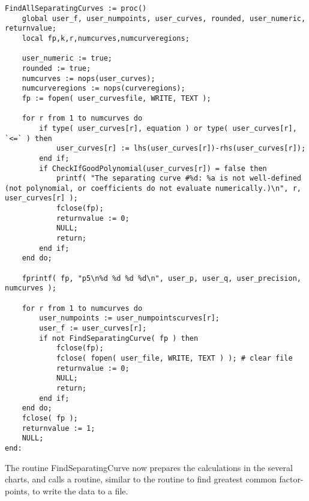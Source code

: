 \documentclass[a4paper,10pt]{article}
\begin{document}
\begin{lstlisting}[name=separatingcurves]
FindAllSeparatingCurves := proc()
    global user_f, user_numpoints, user_curves, rounded, user_numeric, returnvalue;
    local fp,k,r,numcurves,numcurveregions;

    user_numeric := true;
    rounded := true;
    numcurves := nops(user_curves);
    numcurveregions := nops(curveregions);
    fp := fopen( user_curvesfile, WRITE, TEXT );

    for r from 1 to numcurves do
        if type( user_curves[r], equation ) or type( user_curves[r], `<=` ) then
            user_curves[r] := lhs(user_curves[r])-rhs(user_curves[r]);
        end if;
        if CheckIfGoodPolynomial(user_curves[r]) = false then
            printf( "The separating curve #%d: %a is not well-defined (not polynomial, or coefficients do not evaluate numerically.)\n", r, user_curves[r] );
            fclose(fp);
            returnvalue := 0;
            NULL;
            return;
        end if;
    end do;

    fprintf( fp, "p5\n%d %d %d %d\n", user_p, user_q, user_precision, numcurves );

    for r from 1 to numcurves do
        user_numpoints := user_numpointscurves[r];
        user_f := user_curves[r];
        if not FindSeparatingCurve( fp ) then
            fclose(fp);
            fclose( fopen( user_file, WRITE, TEXT ) ); # clear file
            returnvalue := 0;
            NULL;
            return;
        end if;
    end do;
    fclose( fp );
    returnvalue := 1;
    NULL;
end:
\end{lstlisting}

The routine FindSeparatingCurve now prepares the calculations in the several charts, and calls a routine, similar to the routine to find greatest common factor-points, to write the data to a file.
\end{document}
